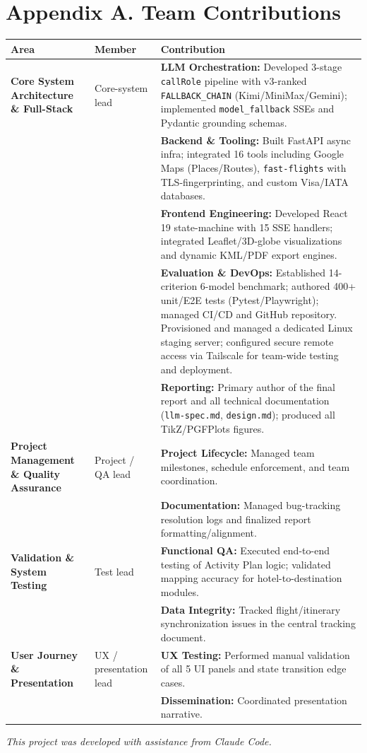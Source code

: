 \documentclass{article}
\begin{document}
\appendix
\section*{Appendix A. Team Contributions}

\begin{table}[H]
\centering
\small
\begin{tabular}{@{}p{3.2cm}p{2.6cm}p{8.5cm}@{}}
\toprule
\textbf{Area} & \textbf{Member} & \textbf{Contribution}\\
\midrule
\textbf{Core System Architecture \& Full-Stack} &
  Core-system lead &
  \textbf{LLM Orchestration:} Developed 3-stage \texttt{callRole} pipeline with v3-ranked \texttt{FALLBACK\_CHAIN} (Kimi/MiniMax/Gemini); implemented \texttt{model\_fallback} SSEs and Pydantic grounding schemas. \\
  & & \textbf{Backend \& Tooling:} Built FastAPI async infra; integrated 16 tools including Google Maps (Places/Routes), \texttt{fast-flights} with TLS-fingerprinting, and custom Visa/IATA databases. \\
  & & \textbf{Frontend Engineering:} Developed React 19 state-machine with 15 SSE handlers; integrated Leaflet/3D-globe visualizations and dynamic KML/PDF export engines. \\
  & & \textbf{Evaluation \& DevOps:} Established 14-criterion 6-model benchmark; authored 400+ unit/E2E tests (Pytest/Playwright); managed CI/CD and GitHub repository. Provisioned and managed a dedicated Linux staging server; configured secure remote access via Tailscale for team-wide testing and deployment. \\
  & & \textbf{Reporting:} Primary author of the final report and all technical documentation (\texttt{llm-spec.md}, \texttt{design.md}); produced all TikZ/PGFPlots figures. \\
\midrule
\textbf{Project Management \& Quality Assurance} &
  Project / QA lead &
  \textbf{Project Lifecycle:} Managed team milestones, schedule enforcement, and team coordination. \\
  & & \textbf{Documentation:} Managed bug-tracking resolution logs and finalized report formatting/alignment. \\
\midrule
\textbf{Validation \& System Testing} &
  Test lead &
  \textbf{Functional QA:} Executed end-to-end testing of Activity Plan logic; validated mapping accuracy for hotel-to-destination modules. \\
  & & \textbf{Data Integrity:} Tracked flight/itinerary synchronization issues in the central tracking document. \\
\midrule
\textbf{User Journey \& Presentation} &
  UX / presentation lead &
  \textbf{UX Testing:} Performed manual validation of all 5 UI panels and state transition edge cases. \\
  & & \textbf{Dissemination:} Coordinated presentation narrative. \\
\bottomrule
\end{tabular}
\end{table}

\vspace{1em}
\noindent\small\textit{This project was developed with assistance from Claude Code.}
\end{document}
